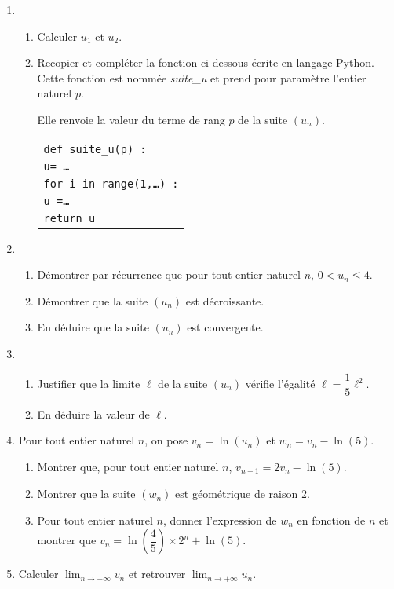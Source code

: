 \documentclass[11pt]{article}
\begin{document}
\begin{enumerate}
\item 
	\begin{enumerate}
		\item Calculer $u_1$ et $u_2$.
		\item Recopier et compléter la fonction ci-dessous écrite en langage Python.
Cette fonction est nommée \emph{suite\_u} et prend pour paramètre l'entier naturel $p$.

Elle renvoie la valeur du terme de rang $p$ de la suite $\left(u_n\right)$.

\begin{center}
\begin{tabular}{l}
\texttt{def suite\_u(p) :}\\
	\quad \texttt{u= \ldots}\\
	\quad \texttt{for i in range(1,\ldots) :}\\
	\quad \quad \texttt{u =\ldots}\\
	\quad \texttt{return u}\\
	\end{tabular}
\end{center}

	\end{enumerate}
\item 
	\begin{enumerate}
		\item Démontrer par récurrence que pour tout entier naturel $n$,\: $0 < u_n \leqslant 4$.
		\item Démontrer que la suite $\left(u_n\right)$ est décroissante.
		\item En déduire que la suite $\left(u_n\right)$ est convergente.
	\end{enumerate}
\item 
	\begin{enumerate}
		\item Justifier que la limite $\ell$ de la suite $\left(u_n\right)$ vérifie l'égalité $\ell = \dfrac15 \ell^2$.
		\item En déduire la valeur de $\ell$.
	\end{enumerate}
\item Pour tout entier naturel $n$, on pose $v_n = \ln \left(u_n\right)$ et $w_n = v_n - \ln (5)$.
	\begin{enumerate}
		\item Montrer que, pour tout entier naturel $n$,\: $v_{n+1} = 2v_n - \ln (5)$.
		\item Montrer que la suite $\left(w_n\right)$ est géométrique de raison 2.
		\item Pour tout entier naturel $n$, donner l'expression de $w_n$ en fonction de $n$ et montrer que $v_n = \ln \left(\dfrac45 \right) \times 2^n + \ln (5)$.
	\end{enumerate}
\item Calculer $\displaystyle\lim_{n \to + \infty} v_n$ et retrouver $\displaystyle\lim_{n \to + \infty} u_n$.
\end{enumerate}
\end{document}
